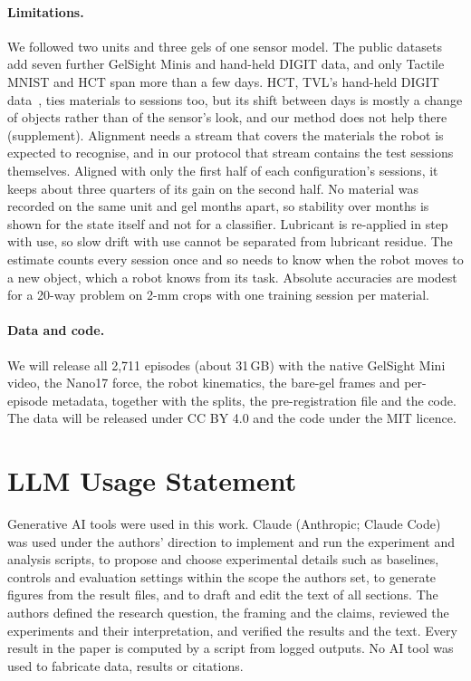 \paragraph{Limitations.}
We followed two units and three gels of one sensor model. The public datasets add seven further GelSight Minis and hand-held DIGIT data, and only Tactile MNIST and HCT span more than a few days. HCT, TVL's hand-held DIGIT data~\cite{tvl2024}, ties materials to sessions too, but its shift between days is mostly a change of objects rather than of the sensor's look, and our method does not help there (supplement). Alignment needs a stream that covers the materials the robot is expected to recognise, and in our protocol that stream contains the test sessions themselves. Aligned with only the first half of each configuration's sessions, it keeps about three quarters of its gain on the second half.
No material was recorded on the same unit and gel months apart, so stability over months is shown for the state itself and not for a classifier. Lubricant is re-applied in step with use, so slow drift with use cannot be separated from lubricant residue. The estimate counts every session once and so needs to know when the robot moves to a new object, which a robot knows from its task. Absolute accuracies are modest for a 20-way problem on 2-mm crops with one training session per material.

\paragraph{Data and code.}
We will release all 2,711 episodes (about 31\,GB) with the native GelSight Mini video, the Nano17 force, the robot kinematics, the bare-gel frames and per-episode metadata, together with the splits, the pre-registration file and the code. The data will be released under CC BY 4.0 and the code under the MIT licence.

\section*{LLM Usage Statement}
Generative AI tools were used in this work. Claude (Anthropic; Claude Code) was used under the authors' direction to implement and run the experiment and analysis scripts, to propose and choose experimental details such as baselines, controls and evaluation settings within the scope the authors set, to generate figures from the result files, and to draft and edit the text of all sections. The authors defined the research question, the framing and the claims, reviewed the experiments and their interpretation, and verified the results and the text. Every result in the paper is computed by a script from logged outputs. No AI tool was used to fabricate data, results or citations.
